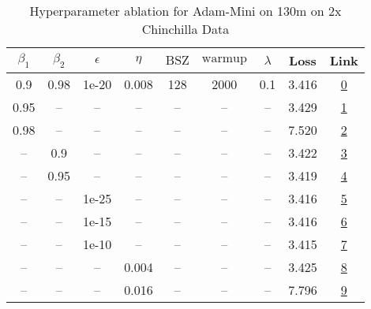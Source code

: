 \begin{table}[H]
\centering
\caption{Hyperparameter ablation for Adam-Mini on 130m on 2x Chinchilla Data}
\label{tab:ablation_adam-mini_130m_2}
\begin{tabular}{ccccccccc}
\toprule
$\beta_1$ & $\beta_2$ & $\epsilon$ & $\eta$ & $\mathrm{BSZ}$ & $\mathrm{warmup}$ & $\lambda$ & Loss & Link \\
\midrule
0.9 & 0.98 & 1e-20 & 0.008 & 128 & 2000 & 0.1 & 3.416 & \href{https://wandb.ai/stanford-mercury/optimizer-scaling/runs/sweep-130m-5B-mini609ad2lr0.008-wd0.1-minlr0-warmup2000-b10.9-b2-b557c0}{0} \\
\midrule
0.95 & -- & -- & -- & -- & -- & -- & 3.429 & \href{https://wandb.ai/stanford-mercury/optimizer-scaling/runs/sweep-130m-5B-mini20b8b1lr0.008-wd0.1-minlr0-warmup2000-b10.95-b-b46cb8}{1} \\
0.98 & -- & -- & -- & -- & -- & -- & 7.520 & \href{https://wandb.ai/stanford-mercury/optimizer-scaling/runs/sweep-130m-5B-minideec58lr0.008-wd0.1-minlr0-warmup2000-b10.98-b-62bc48}{2} \\
-- & 0.9 & -- & -- & -- & -- & -- & 3.422 & \href{https://wandb.ai/stanford-mercury/optimizer-scaling/runs/sweep-130m-5B-minib27e6blr0.008-wd0.1-minlr0-warmup2000-b10.9-b2-04f0b5}{3} \\
-- & 0.95 & -- & -- & -- & -- & -- & 3.419 & \href{https://wandb.ai/stanford-mercury/optimizer-scaling/runs/sweep-130m-5B-mini51a865lr0.008-wd0.1-minlr0-warmup2000-b10.9-b2-856cfa}{4} \\
-- & -- & 1e-25 & -- & -- & -- & -- & 3.416 & \href{https://wandb.ai/stanford-mercury/optimizer-scaling/runs/sweep-130m-5B-mini7d5c8flr0.008-wd0.1-minlr0-warmup2000-b10.9-b2-dd8629}{5} \\
-- & -- & 1e-15 & -- & -- & -- & -- & 3.416 & \href{https://wandb.ai/stanford-mercury/optimizer-scaling/runs/sweep-130m-5B-mini8f577dlr0.008-wd0.1-minlr0-warmup2000-b10.9-b2-361bf6}{6} \\
-- & -- & 1e-10 & -- & -- & -- & -- & 3.415 & \href{https://wandb.ai/stanford-mercury/optimizer-scaling/runs/sweep-130m-5B-minidbb1e7lr0.008-wd0.1-minlr0-warmup2000-b10.9-b2-9d6767}{7} \\
-- & -- & -- & 0.004 & -- & -- & -- & 3.425 & \href{https://wandb.ai/stanford-mercury/optimizer-scaling/runs/sweep-130m-5B-miniab7841lr0.004-wd0.1-minlr0-warmup2000-b10.9-b2-0d5f4f}{8} \\
-- & -- & -- & 0.016 & -- & -- & -- & 7.796 & \href{https://wandb.ai/stanford-mercury/optimizer-scaling/runs/sweep-130m-5B-mini3fbff3lr0.016-wd0.1-minlr0-warmup2000-b10.9-b2-e1ec05}{9} \\

\end{tabular}
\end{table}
